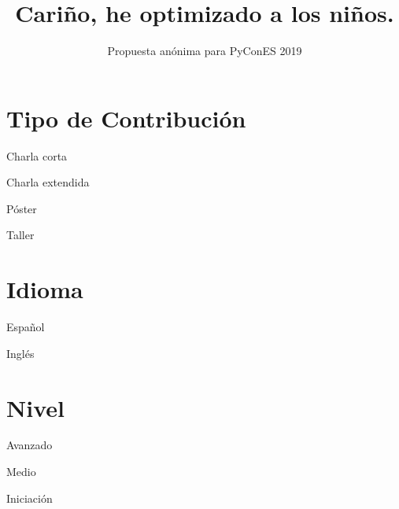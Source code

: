 \documentclass[runningheads]{llncs}
\newcommand{\cmark}{\ding{51}}%
\newcommand{\done}{\rlap{$\square$}{\raisebox{2pt}{\large\hspace{1pt}\cmark}}%
\hspace{-2.5pt}}
\begin{document}
\pagestyle{headings}
\mainmatter


\title{Cariño, he optimizado a los niños.} %


\author{Propuesta an\'onima para PyConES 2019}

\maketitle

\section{Tipo de Contribuci\'on}

\begin{todolist}
  \item Charla corta
  \item [\done]Charla extendida
  \item P\'oster
  \item Taller
  \end{todolist}


\section{Idioma}
\begin{todolist}
  \item [\done]Espa\~nol
  \item Ingl\'es
\end{todolist}
\section{Nivel}

\begin{todolist}
  \item Avanzado
  \item [\done] Medio
  \item Iniciaci\'on
  \end{todolist}


\newpage
\end{document}
